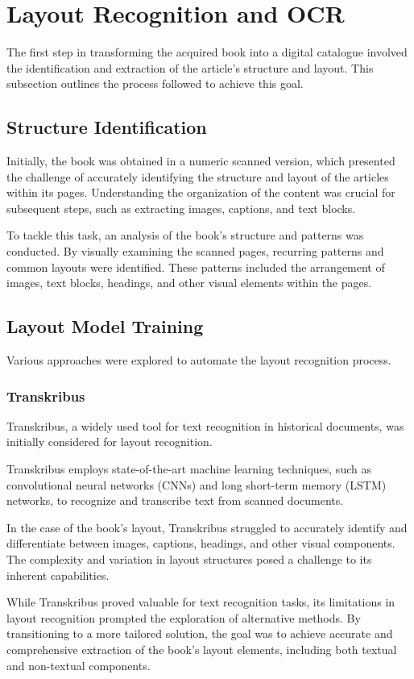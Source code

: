 \section{Layout Recognition and OCR}
The first step in transforming the acquired book into a digital catalogue involved the identification and extraction of the article's structure and layout. This subsection outlines the process followed to achieve this goal.

\subsection{Structure Identification}
Initially, the book was obtained in a numeric scanned version, which presented the challenge of accurately identifying the structure and layout of the articles within its pages. Understanding the organization of the content was crucial for subsequent steps, such as extracting images, captions, and text blocks.

To tackle this task, an analysis of the book's structure and patterns was conducted. By visually examining the scanned pages, recurring patterns and common layouts were identified. These patterns included the arrangement of images, text blocks, headings, and other visual elements within the pages.

\subsection{Layout Model Training}
Various approaches were explored to automate the layout recognition process.
\subsubsection{Transkribus \parencite{transkribus}} 
Transkribus, a widely used tool for text recognition in historical documents, was initially considered for layout recognition.

Transkribus employs state-of-the-art machine learning techniques, such as convolutional neural networks (CNNs) and long short-term memory (LSTM) networks, to recognize and transcribe text from scanned documents.

In the case of the book's layout, Transkribus struggled to accurately identify and differentiate between images, captions, headings, and other visual components. The complexity and variation in layout structures posed a challenge to its inherent capabilities.

While Transkribus proved valuable for text recognition tasks, its limitations in layout recognition prompted the exploration of alternative methods.
By transitioning to a more tailored solution, the goal was to achieve accurate and comprehensive extraction of the book's layout elements, including both textual and non-textual components.

